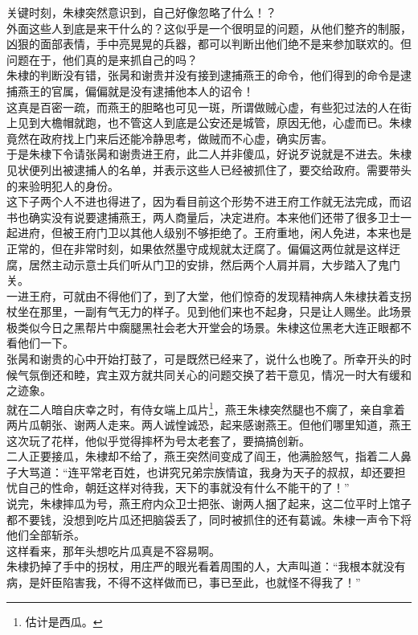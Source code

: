 \begin{multicols}{\theparacolNo}
关键时刻，朱棣突然意识到，自己好像忽略了什么！？\\

外面这些人到底是来干什么的？这似乎是一个很明显的问题，从他们整齐的制服，凶狠的面部表情，手中亮晃晃的兵器，都可以判断出他们绝不是来参加联欢的。但问题在于，他们真的是来抓自己的吗？\\

朱棣的判断没有错，张昺和谢贵并没有接到逮捕燕王的命令，他们得到的命令是逮捕燕王的官属，偏偏就是没有逮捕他本人的诏令！\\

这真是百密一疏，而燕王的胆略也可见一斑，所谓做贼心虚，有些犯过法的人在街上见到大檐帽就跑，也不管这人到底是公安还是城管，原因无他，心虚而已。朱棣竟然在政府找上门来后还能冷静思考，做贼而不心虚，确实厉害。\\

于是朱棣下令请张昺和谢贵进王府，此二人并非傻瓜，好说歹说就是不进去。朱棣见状便列出被逮捕人的名单，并表示这些人已经被抓住了，要交给政府。需要带头的来验明犯人的身份。\\

这下子两个人不进也得进了，因为看目前这个形势不进王府工作就无法完成，而诏书也确实没有说要逮捕燕王，两人商量后，决定进府。本来他们还带了很多卫士一起进府，但被王府门卫以其他人级别不够拒绝了。王府重地，闲人免进，本来也是正常的，但在非常时刻，如果依然墨守成规就太迂腐了。偏偏这两位就是这样迂腐，居然主动示意士兵们听从门卫的安排，然后两个人肩并肩，大步踏入了鬼门关。\\

一进王府，可就由不得他们了，到了大堂，他们惊奇的发现精神病人朱棣扶着支拐杖坐在那里，一副有气无力的样子。见到他们来也不起身，只是让人赐坐。此场景极类似今日之黑帮片中瘸腿黑社会老大开堂会的场景。朱棣这位黑老大连正眼都不看他们一下。\\

张昺和谢贵的心中开始打鼓了，可是既然已经来了，说什么也晚了。所幸开头的时候气氛倒还和睦，宾主双方就共同关心的问题交换了若干意见，情况一时大有缓和之迹象。\\

就在二人暗自庆幸之时，有侍女端上瓜片\footnote{估计是西瓜。}，燕王朱棣突然腿也不瘸了，亲自拿着两片瓜朝张、谢两人走来。两人诚惶诚恐，起来感谢燕王。但他们哪里知道，燕王这次玩了花样，他似乎觉得摔杯为号太老套了，要搞搞创新。\\

二人正要接瓜，朱棣却不给了，燕王突然间变成了阎王，他满脸怒气，指着二人鼻子大骂道：“连平常老百姓，也讲究兄弟宗族情谊，我身为天子的叔叔，却还要担忧自己的性命，朝廷这样对待我，天下的事就没有什么不能干的了！”\\

说完，朱棣摔瓜为号，燕王府内众卫士把张、谢两人捆了起来，这二位平时上馆子都不要钱，没想到吃片瓜还把脑袋丢了，同时被抓住的还有葛诚。朱棣一声令下将他们全部斩杀。\\

这样看来，那年头想吃片瓜真是不容易啊。\\

朱棣扔掉了手中的拐杖，用庄严的眼光看着周围的人，大声叫道：“我根本就没有病，是奸臣陷害我，不得不这样做而已，事已至此，也就怪不得我了！”\\
\ifnum{}
	\end{multicols}
\fi
\newpage
